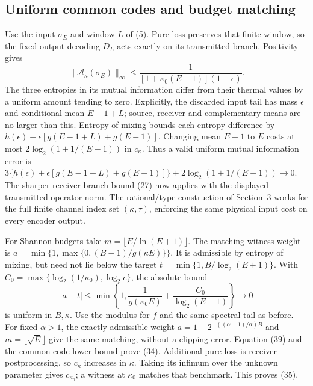 \subsection{Uniform common codes and budget matching}
Use the input \(\sigma_E\) and window \(L\) of (5). Pure loss preserves
that finite window, so the fixed output decoding \(D_L\) acts exactly
on its transmitted branch. Positivity gives
\[
 \|\mathcal A_\kappa(\sigma_E)\|_\infty
 \le\frac1{[1+\kappa_0(E-1)](1-\epsilon)} .
\]
The three entropies in its mutual information differ from their thermal
values by a uniform amount tending to zero. Explicitly, the discarded
input tail has mass \(\epsilon\) and conditional mean \(E-1+L\);
source, receiver and complementary means are no larger than this.
Entropy of mixing bounds each entropy difference by
\(h(\epsilon)+\epsilon[g(E-1+L)+g(E-1)]\).
Changing mean \(E-1\) to \(E\) costs at most
\(2\log_2(1+1/(E-1))\) in \(c_\kappa\). Thus a valid uniform mutual
information error is
\(3\{h(\epsilon)+\epsilon[g(E-1+L)+g(E-1)]\}
     +2\log_2(1+1/(E-1))\to0\).
The sharper receiver branch bound (27) now applies with the displayed
transmitted operator norm. The rational/type construction of Section~3
works for the full finite channel index set \((\kappa,\tau)\), enforcing
the same physical input cost on every encoder output.

For Shannon budgets take \(m=\lfloor E/\ln(E+1)\rfloor\).
The matching witness weight is
\(a=\min\{1,\max\{0,(B-1)/g(\kappa E)\}\}\).
It is admissible by entropy of mixing, but need not lie below the
target \(t=\min\{1,B/\log_2(E+1)\}\).
With \(C_0=\max\{\log_2(1/\kappa_0),\log_2 e\}\), the absolute bound
\[
 |a-t|\le\min\left\{1,\frac1{g(\kappa_0 E)}
                              +\frac{C_0}{\log_2(E+1)}\right\}\to0
\]
is uniform in \(B,\kappa\). Use the modulus for \(f\) and the same
spectral tail as before. For fixed \(\alpha>1\), the exactly admissible
weight \(a=1-2^{-((\alpha-1)/\alpha)B}\) and \(m=\lfloor\sqrt E\rfloor\)
give the same matching, without a clipping error. Equation (39) and the
common-code lower bound prove (34).
Additional pure loss is receiver postprocessing, so \(c_\kappa\) increases
in \(\kappa\). Taking its infimum over the unknown parameter gives
\(c_{\kappa_0}\); a witness at \(\kappa_0\) matches that benchmark.
This proves (35).
